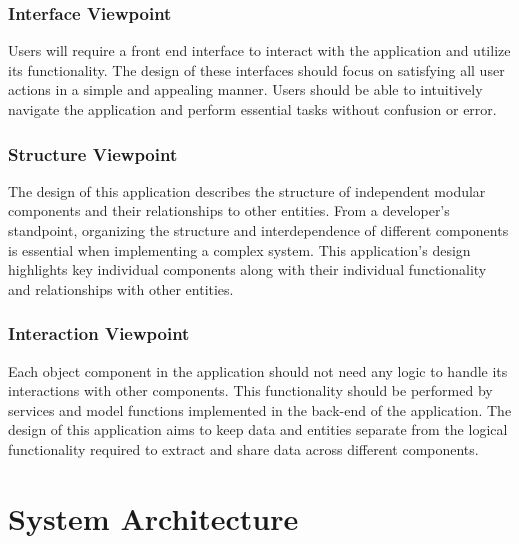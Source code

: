 \documentclass[journal,10pt,onecolumn,compsoc]{IEEEtran}
\begin{document}
    \subsubsection{Interface Viewpoint}  
    Users will require a front end interface to interact with the application and utilize its functionality. The design of these interfaces should focus on satisfying all user actions in a simple and appealing manner. Users should be able to intuitively navigate the application and perform essential tasks without confusion or error.
    \subsubsection{Structure Viewpoint} 
    The design of this application describes the structure of independent modular components and their relationships to other entities. From a developer's standpoint, organizing the structure and interdependence of different components is essential when implementing a complex system. This application's design highlights key individual components along with their individual functionality and relationships with other entities. 
    \subsubsection{Interaction Viewpoint}  
    Each object component in the application should not need any logic to handle its interactions with other components. This functionality should be performed by services and model functions implemented in the back-end of the application. The design of this application aims to keep data and entities separate from the logical functionality required to extract and share data across different components.
    \section{System Architecture}
\end{document}
